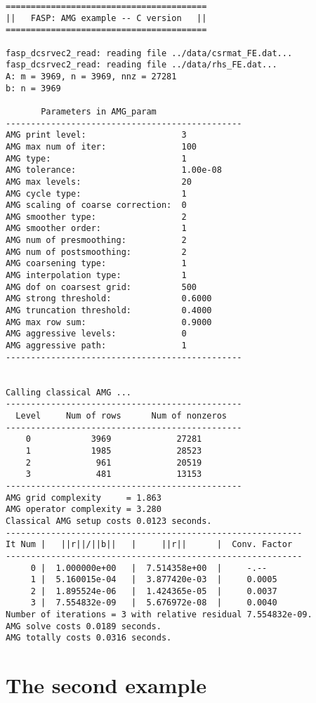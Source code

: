 \documentclass[11pt]{memoir}
\begin{document}
\begin{lstlisting}[numbers=none]
========================================
||   FASP: AMG example -- C version   ||
========================================

fasp_dcsrvec2_read: reading file ../data/csrmat_FE.dat...
fasp_dcsrvec2_read: reading file ../data/rhs_FE.dat...
A: m = 3969, n = 3969, nnz = 27281
b: n = 3969

       Parameters in AMG_param
-----------------------------------------------
AMG print level:                   3
AMG max num of iter:               100
AMG type:                          1
AMG tolerance:                     1.00e-08
AMG max levels:                    20
AMG cycle type:                    1
AMG scaling of coarse correction:  0
AMG smoother type:                 2
AMG smoother order:                1
AMG num of presmoothing:           2
AMG num of postsmoothing:          2
AMG coarsening type:               1
AMG interpolation type:            1
AMG dof on coarsest grid:          500
AMG strong threshold:              0.6000
AMG truncation threshold:          0.4000
AMG max row sum:                   0.9000
AMG aggressive levels:             0
AMG aggressive path:               1
-----------------------------------------------


Calling classical AMG ...
-----------------------------------------------
  Level     Num of rows      Num of nonzeros
-----------------------------------------------
    0            3969             27281
    1            1985             28523
    2             961             20519
    3             481             13153
-----------------------------------------------
AMG grid complexity     = 1.863
AMG operator complexity = 3.280
Classical AMG setup costs 0.0123 seconds.
-----------------------------------------------------------
It Num |   ||r||/||b||   |     ||r||      |  Conv. Factor
-----------------------------------------------------------
     0 |  1.000000e+00   |  7.514358e+00  |     -.--
     1 |  5.160015e-04   |  3.877420e-03  |     0.0005
     2 |  1.895524e-06   |  1.424365e-05  |     0.0037
     3 |  7.554832e-09   |  5.676972e-08  |     0.0040
Number of iterations = 3 with relative residual 7.554832e-09.
AMG solve costs 0.0189 seconds.
AMG totally costs 0.0316 seconds.
\end{lstlisting}



\section{The second example}\label{sec:ex2}
\end{document}
